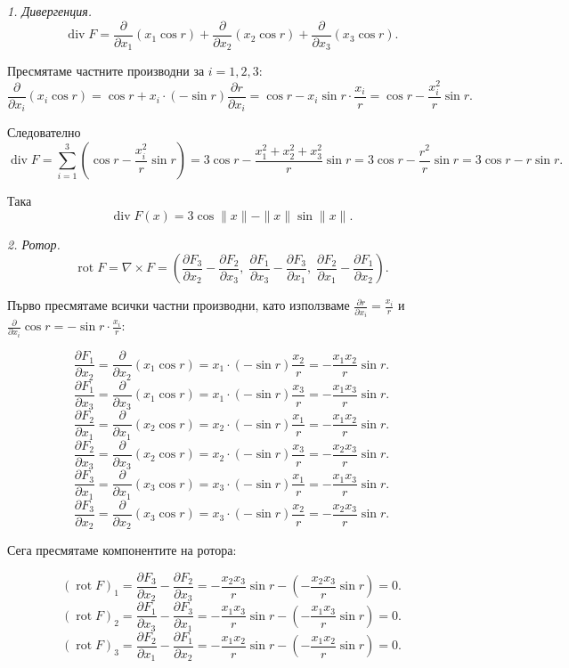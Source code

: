 \documentclass[10pt]{article}
\begin{document}
\textit{1. Дивергенция.}
\[
\operatorname{div} F = \frac{\partial}{\partial x_1}(x_1\cos r) + \frac{\partial}{\partial x_2}(x_2\cos r) + \frac{\partial}{\partial x_3}(x_3\cos r).
\]

Пресмятаме частните производни за $i = 1,2,3$:
\[
\frac{\partial}{\partial x_i}(x_i\cos r) = \cos r + x_i \cdot (-\sin r)\frac{\partial r}{\partial x_i} = \cos r - x_i \sin r \cdot \frac{x_i}{r} = \cos r - \frac{x_i^2}{r}\sin r.
\]

Следователно
\[
\operatorname{div} F = \sum_{i=1}^3 \left( \cos r - \frac{x_i^2}{r}\sin r \right) = 3\cos r - \frac{x_1^2 + x_2^2 + x_3^2}{r}\sin r = 3\cos r - \frac{r^2}{r}\sin r = 3\cos r - r\sin r.
\]

Така
\[
\boxed{\operatorname{div} F(x) = 3\cos\|x\| - \|x\|\sin\|x\|}.
\]

\textit{2. Ротор.}
\[
\operatorname{rot} F = \nabla \times F = \left( \frac{\partial F_3}{\partial x_2} - \frac{\partial F_2}{\partial x_3},\; \frac{\partial F_1}{\partial x_3} - \frac{\partial F_3}{\partial x_1},\; \frac{\partial F_2}{\partial x_1} - \frac{\partial F_1}{\partial x_2} \right).
\]

Първо пресмятаме всички частни производни, като използваме $\frac{\partial r}{\partial x_i} = \frac{x_i}{r}$ и $\frac{\partial}{\partial x_i}\cos r = -\sin r \cdot \frac{x_i}{r}$:

\[
\frac{\partial F_1}{\partial x_2} = \frac{\partial}{\partial x_2}(x_1\cos r) = x_1 \cdot (-\sin r)\frac{x_2}{r} = -\frac{x_1x_2}{r}\sin r.
\]
\[
\frac{\partial F_1}{\partial x_3} = \frac{\partial}{\partial x_3}(x_1\cos r) = x_1 \cdot (-\sin r)\frac{x_3}{r} = -\frac{x_1x_3}{r}\sin r.
\]
\[
\frac{\partial F_2}{\partial x_1} = \frac{\partial}{\partial x_1}(x_2\cos r) = x_2 \cdot (-\sin r)\frac{x_1}{r} = -\frac{x_1x_2}{r}\sin r.
\]
\[
\frac{\partial F_2}{\partial x_3} = \frac{\partial}{\partial x_3}(x_2\cos r) = x_2 \cdot (-\sin r)\frac{x_3}{r} = -\frac{x_2x_3}{r}\sin r.
\]
\[
\frac{\partial F_3}{\partial x_1} = \frac{\partial}{\partial x_1}(x_3\cos r) = x_3 \cdot (-\sin r)\frac{x_1}{r} = -\frac{x_1x_3}{r}\sin r.
\]
\[
\frac{\partial F_3}{\partial x_2} = \frac{\partial}{\partial x_2}(x_3\cos r) = x_3 \cdot (-\sin r)\frac{x_2}{r} = -\frac{x_2x_3}{r}\sin r.
\]

Сега пресмятаме компонентите на ротора:

\[
(\operatorname{rot} F)_1 = \frac{\partial F_3}{\partial x_2} - \frac{\partial F_2}{\partial x_3} = -\frac{x_2x_3}{r}\sin r - \left(-\frac{x_2x_3}{r}\sin r\right) = 0.
\]
\[
(\operatorname{rot} F)_2 = \frac{\partial F_1}{\partial x_3} - \frac{\partial F_3}{\partial x_1} = -\frac{x_1x_3}{r}\sin r - \left(-\frac{x_1x_3}{r}\sin r\right) = 0.
\]
\[
(\operatorname{rot} F)_3 = \frac{\partial F_2}{\partial x_1} - \frac{\partial F_1}{\partial x_2} = -\frac{x_1x_2}{r}\sin r - \left(-\frac{x_1x_2}{r}\sin r\right) = 0.
\]
\end{document}
